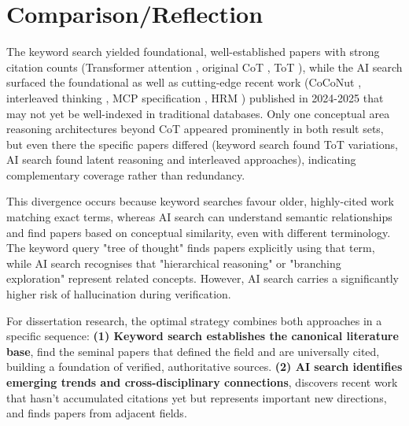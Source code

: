 \documentclass[a4paper,oneside,12pt]{book}
\numberwithin{equation}{chapter} %
\begin{document}
\section{Comparison/Reflection}

The keyword search yielded foundational, well-established papers with strong citation counts (Transformer attention \cite{vaswani2023attentionneed}, original CoT \cite{wei2023chainofthoughtpromptingelicitsreasoning}, ToT \cite{yao2023treethoughtsdeliberateproblem}), while the AI search surfaced the foundational as well as cutting-edge recent work (CoCoNut \cite{hao2025traininglargelanguagemodels}, interleaved thinking \cite{xie2025interleavedreasoninglargelanguage}, MCP specification \cite{anthropic2024mcp}, HRM \cite{wang2025hierarchicalreasoningmodel}) published in 2024-2025 that may not yet be well-indexed in traditional databases. Only one conceptual area reasoning architectures beyond CoT appeared prominently in both result sets, but even there the specific papers differed (keyword search found ToT variations, AI search found latent reasoning and interleaved approaches), indicating complementary coverage rather than redundancy.

This divergence occurs because keyword searches favour older, highly-cited work matching exact terms, whereas AI search can understand semantic relationships and find papers based on conceptual similarity, even with different terminology. The keyword query "tree of thought" finds papers explicitly using that term, while AI search recognises that "hierarchical reasoning" or "branching exploration" represent related concepts. However, AI search carries a significantly higher risk of hallucination during verification.

For dissertation research, the optimal strategy combines both approaches in a specific sequence: \textbf{(1) Keyword search establishes the canonical literature base}, find the seminal papers that defined the field and are universally cited, building a foundation of verified, authoritative sources. \textbf{(2) AI search identifies emerging trends and cross-disciplinary connections}, discovers recent work that hasn't accumulated citations yet but represents important new directions, and finds papers from adjacent fields. 
\end{document}
